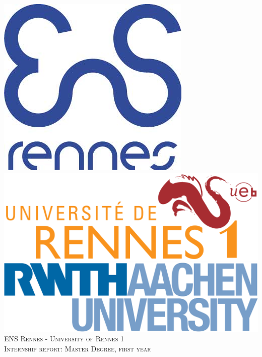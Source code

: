 \documentclass[a4paper,10pt]{llncs}
\title{}
\author{}
\begin{document}
\begin{titlepage}
 \begin{center}
  \includegraphics[scale=0.17]{ENS.jpg}
  \includegraphics[scale=0.17]{Rennes.png}
  \includegraphics[scale=0.4]{rwth.jpg}\\[2cm]

  \textsc{\LARGE ENS Rennes - University of Rennes 1}\\[1cm]
  \textsc{\Large Internship report: Master Degree, first year}\\[3.5cm]
  

\end{center}
\end{titlepage}
\end{document}
